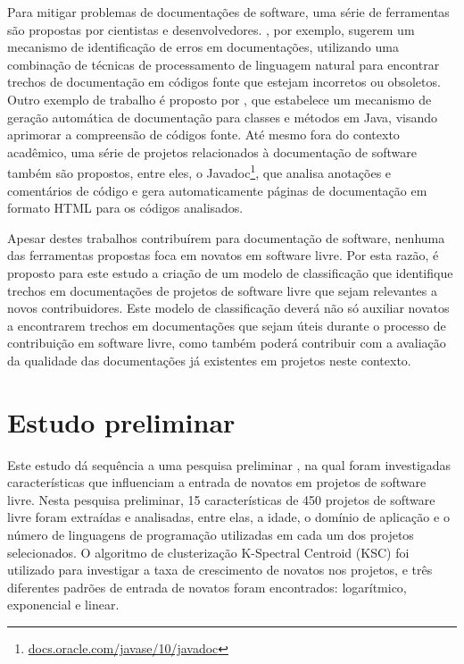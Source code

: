 Para mitigar problemas de documentações de software, uma série de ferramentas são propostas por cientistas e desenvolvedores.  \citet{zhong2013detecting}, por exemplo, sugerem um mecanismo de identificação de erros em documentações, utilizando uma combinação de técnicas de processamento de linguagem natural para encontrar trechos de documentação em códigos fonte que estejam incorretos ou obsoletos. Outro exemplo de trabalho é proposto por \citet{haiduc2010automated}, que estabelece um mecanismo de geração automática de documentação para classes e métodos em Java, visando aprimorar a compreensão de códigos fonte. Até mesmo fora do contexto acadêmico, uma série de projetos relacionados à documentação de software também são propostos, entre eles, o Javadoc\footnote{\url{docs.oracle.com/javase/10/javadoc}}, que analisa anotações e comentários de código e gera automaticamente páginas de documentação em formato HTML para os códigos analisados.  

Apesar destes trabalhos contribuírem para documentação de software, nenhuma das ferramentas propostas foca em novatos em software livre. Por esta razão, é proposto para este estudo a criação de um modelo de classificação que identifique trechos em documentações de projetos de software livre que sejam relevantes a novos contribuidores. Este modelo de classificação deverá não só auxiliar novatos a encontrarem trechos em documentações que sejam úteis durante o processo de contribuição em software livre, como também poderá contribuir com a avaliação da qualidade das documentações já existentes em projetos neste contexto.

\section{Estudo preliminar}
Este estudo dá sequência a uma pesquisa preliminar \citep{fronchetti2019attracts}, na qual foram investigadas características que influenciam a entrada de novatos em projetos de software livre. Nesta pesquisa preliminar, 15 características de 450 projetos de software livre foram extraídas e analisadas, entre elas, a idade, o domínio de aplicação e o número de linguagens de programação utilizadas em cada um dos projetos selecionados. O algoritmo de clusterização K-Spectral Centroid (KSC) foi utilizado para investigar a taxa de crescimento de novatos nos projetos, e três diferentes padrões de entrada de novatos foram encontrados: logarítmico, exponencial e linear. 

